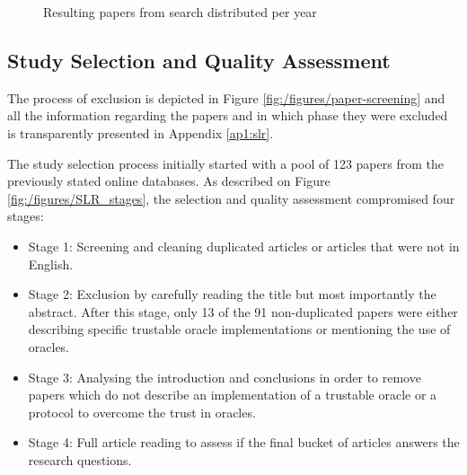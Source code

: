 \begin{figure}[H]
  \centering
  \caption{Resulting papers from search distributed per year}
  \label{search-results-per-year}
\end{figure}


\subsection{Study Selection and Quality Assessment}

The process of exclusion is depicted in Figure \ref{fig:/figures/paper-screening} and all the information regarding the papers and in which phase they were excluded is transparently presented in Appendix \ref{ap1:slr}.

The study selection process initially started with a pool of 123 papers from the previously stated online databases. As described on Figure \ref{fig:/figures/SLR_stages}, the selection and quality assessment compromised four stages:
\begin{itemize}
  \item Stage 1: Screening and cleaning duplicated articles or articles that were not in English.
  \item Stage 2: Exclusion by carefully reading the title but most importantly the abstract. After this stage, only 13 of the 91 non-duplicated papers were either describing specific trustable oracle implementations or mentioning the use of oracles.
  \item Stage 3: Analysing the introduction and conclusions in order to remove papers which do not describe an implementation of a trustable oracle or a protocol to overcome the trust in oracles.
  \item Stage 4: Full article reading to assess if the final bucket of articles answers the research questions.
\end{itemize}


